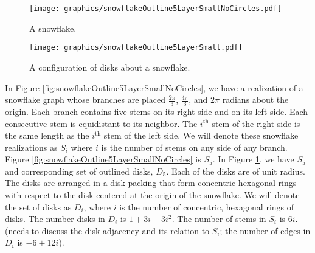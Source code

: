 \begin{figure}[!htbp]
\centering
\begin{minipage}{0.45\textwidth}
\centering
\texttt{[image: graphics/snowflakeOutline5LayerSmallNoCircles.pdf]}
\caption{A snowflake.}\label{fig:snowflakeOutline5LayerSmallNoCircles}
\end{minipage}\hfill
\begin{minipage}{0.45\textwidth}
\centering
\texttt{[image: graphics/snowflakeOutline5LayerSmall.pdf]}
\caption{A configuration of disks about a snowflake.}\label{fig:snowflakeOutline5Layer}
\end{minipage}
\end{figure}
In Figure \ref{fig:snowflakeOutline5LayerSmallNoCircles}, we have a realization of a snowflake graph whose branches are placed $\frac{2 \pi}{3}$, $\frac{4 \pi}{3}$, and $2 \pi$ radians about the origin. Each branch contains five stems on its right side and on its left side.  Each consecutive stem is equidistant to its neighbor.  The $i^\text{th}$ stem of the right side is the same length as the $i^\text{th}$ stem of the left side.  We will denote these snowflake realizations as $S_i$ where $i$ is the number of stems on any side of any branch.  Figure \ref{fig:snowflakeOutline5LayerSmallNoCircles} is $S_5$.  In Figure \ref{fig:snowflakeOutline5Layer}, we have $S_5$ and corresponding set of outlined disks, $D_5$.  Each of the disks are of unit radius.  The disks are arranged in a disk packing that form concentric hexagonal rings with respect to the disk centered at the origin of the snowflake.  We will denote the set of disks as $D_i$, where $i$ is the number of concentric, hexagonal rings of disks.  The number disks in $D_i$ is $1+3i+3i^2$.  The number of stems in $S_i$ is $6i$.  (needs to discuss the disk adjacency and its relation to $S_i$; the number of edges in $D_i$ is $-6 +12i$).


